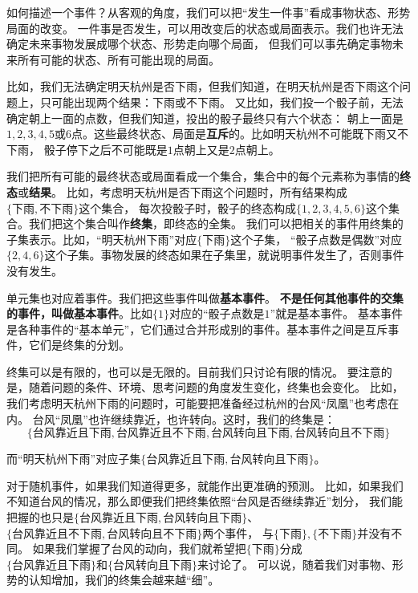 \documentclass[12pt,UTF8]{ctexbook}
\begin{document}
如何描述一个事件？从客观的角度，我们可以把“发生一件事”看成事物状态、形势局面的改变。
一件事是否发生，可以用改变后的状态或局面表示。我们也许无法确定未来事物发展成哪个状态、形势走向哪个局面，
但我们可以事先确定事物未来所有可能的状态、所有可能出现的局面。

比如，我们无法确定明天杭州是否下雨，但我们知道，在明天杭州是否下雨这个问题上，只可能出现两个结果：下雨或不下雨。
又比如，我们投一个骰子前，无法确定朝上一面的点数，但我们知道，投出的骰子最终只有六个状态：
朝上一面是$1,2,3,4,5$或$6$点。这些最终状态、局面是\textbf{互斥}的。比如明天杭州不可能既下雨又不下雨，
骰子停下之后不可能既是$1$点朝上又是$2$点朝上。

我们把所有可能的最终状态或局面看成一个集合，集合中的每个元素称为事情的\textbf{终态}或\textbf{结果}。
比如，考虑明天杭州是否下雨这个问题时，所有结果构成$\{\mbox{下雨}, \mbox{不下雨}\}$这个集合，
每次投骰子时，骰子的终态构成$\{1,2,3,4,5,6\}$这个集合。我们把这个集合叫作\textbf{终集}，即终态的全集。
我们可以把相关的事件用终集的子集表示。比如，“明天杭州下雨”对应$\{\mbox{下雨}\}$这个子集，
“骰子点数是偶数”对应$\{2,4,6\}$这个子集。事物发展的终态如果在子集里，就说明事件发生了，否则事件没有发生。

单元集也对应着事件。我们把这些事件叫做\textbf{基本事件}。
\textbf{不是任何其他事件的交集的事件，叫做基本事件}。比如$\{1\}$对应的“骰子点数是$1$”就是基本事件。
基本事件是各种事件的“基本单元”，它们通过合并形成别的事件。基本事件之间是互斥事件，它们是终集的分划。

终集可以是有限的，也可以是无限的。目前我们只讨论有限的情况。
要注意的是，随着问题的条件、环境、思考问题的角度发生变化，终集也会变化。
比如，我们考虑明天杭州下雨的问题时，可能要把准备经过杭州的台风“凤凰”也考虑在内。
台风“凤凰”也许继续靠近，也许转向。这时，我们的终集是：
$$\{\mbox{台风靠近且下雨}, \mbox{台风靠近且不下雨}, \mbox{台风转向且下雨}, \mbox{台风转向且不下雨}\}$$

而“明天杭州下雨”对应子集$\{\mbox{台风靠近且下雨}, \mbox{台风转向且下雨}\}$。

对于随机事件，如果我们知道得更多，就能作出更准确的预测。
比如，如果我们不知道台风的情况，那么即便我们把终集依照“台风是否继续靠近”划分，
我们能把握的也只是$\{\mbox{台风靠近且下雨}, \mbox{台风转向且下雨}\}$、
$\{\mbox{台风靠近且不下雨}, \mbox{台风转向且不下雨}\}$两个事件，
与$\{\mbox{下雨}\}, \{\mbox{不下雨}\}$并没有不同。
如果我们掌握了台风的动向，我们就希望把$\{\mbox{下雨}\}$分成\\   
$\{\mbox{台风靠近且下雨}\}$和$\{\mbox{台风转向且下雨}\}$来讨论了。
可以说，随着我们对事物、形势的认知增加，我们的终集会越来越“细”。
\end{document}
